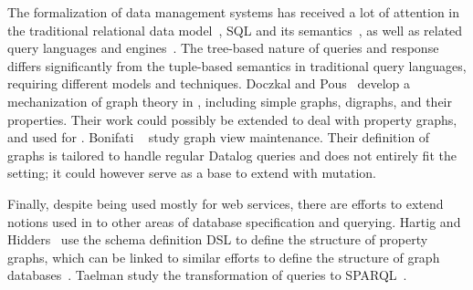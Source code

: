 The formalization of data management systems has received a lot of attention in the traditional 
relational data model~\cite{relationalcoq}, SQL and its semantics~\cite{sqlequiv, hottsql, vesqlengines, vesqlsemantics}, as well as related query languages and engines~\cite{certifdatalog}. The tree-based nature of \gql queries and response differs significantly from the tuple-based semantics in traditional query languages, requiring different models and techniques.
Doczkal and Pous~\cite{graphtheory} develop a mechanization of graph theory in \coq, including simple graphs, digraphs, and their properties. Their work could possibly be extended to deal with property graphs, and used for \gcoql.
Bonifati \etal~\cite{graphviewmaint} study graph view maintenance. Their definition of graphs is tailored to handle regular Datalog queries and does not entirely fit the \gql setting; it could however serve as a base to extend \gcoql with mutation.


Finally, despite being used mostly for web services, there are efforts to extend notions used in \gql to other areas of database specification and querying. Hartig and Hidders~\cite{olafschema} use the \gql schema definition DSL to define the structure of property graphs, which can be linked to similar efforts to define the structure of graph databases~\cite{schemaval}. Taelman \etal study the transformation of \gql queries to SPARQL~\cite{gqlsparql}.



